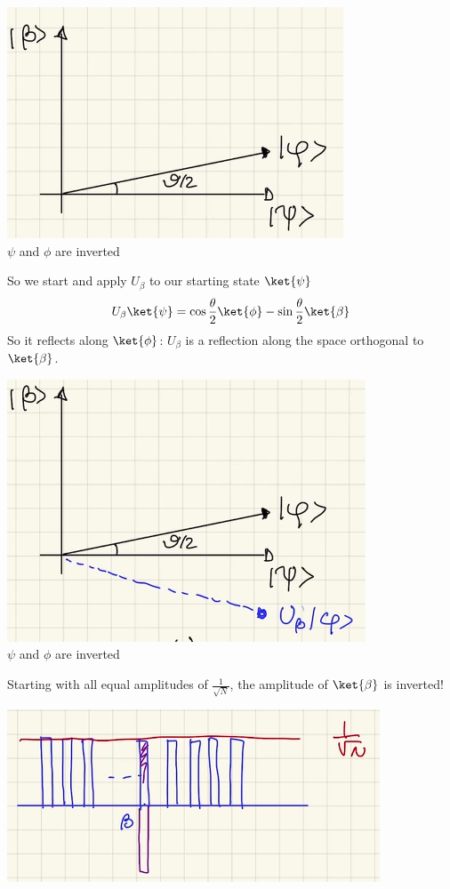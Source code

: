 \documentclass[10pt]{report}
\begin{document}
\begin{center}
	\includegraphics[scale=0.5]{32.png}\\
	$\psi$ and $\phi$ are inverted
\end{center}
So we start and apply $U_\beta$ to our starting state $\ket{\psi}$
$$U_\beta\ket{\psi} = \cos\frac{\theta}{2}\ket{\phi}-\sin\frac{\theta}{2}\ket{\beta}$$
So it reflects along $\ket{\phi}$: $U_\beta$ is a reflection along the space orthogonal to $\ket{\beta}$.
\begin{center}
	\includegraphics[scale=0.5]{33.png}\\
	$\psi$ and $\phi$ are inverted
\end{center}
Starting with all equal amplitudes of $\frac{1}{\sqrt{N}}$, the amplitude of $\ket{\beta}$ is inverted!
\begin{center}
	\includegraphics[scale=0.5]{34.png}
\end{center}
\end{document}
